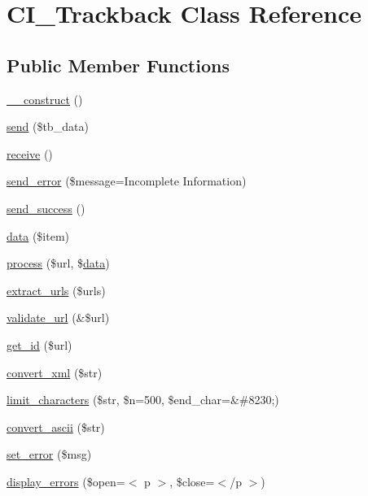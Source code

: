 \hypertarget{class_c_i___trackback}{}\section{C\+I\+\_\+\+Trackback Class Reference}
\label{class_c_i___trackback}
\subsection*{Public Member Functions}
\begin{DoxyCompactItemize}
\item 
\mbox{\hyperlink{class_c_i___trackback_a095c5d389db211932136b53f25f39685}{\+\_\+\+\_\+construct}} ()
\item 
\mbox{\hyperlink{class_c_i___trackback_a4ee54341ef16e67ca033704f4373a56b}{send}} (\$tb\+\_\+data)
\item 
\mbox{\hyperlink{class_c_i___trackback_ac805eb3a4eb25b19c1ab093023da4d35}{receive}} ()
\item 
\mbox{\hyperlink{class_c_i___trackback_a1d4188b1ba4d71ad5392bee635102e87}{send\+\_\+error}} (\$message=\textquotesingle{}Incomplete Information\textquotesingle{})
\item 
\mbox{\hyperlink{class_c_i___trackback_a57468453a4dc88340fdf12fb6e314248}{send\+\_\+success}} ()
\item 
\mbox{\hyperlink{class_c_i___trackback_a4d04a7a984a4bcc71e27be87706f393c}{data}} (\$item)
\item 
\mbox{\hyperlink{class_c_i___trackback_a7244ffd64e186d863812bb300fec8cdc}{process}} (\$url, \$\mbox{\hyperlink{class_c_i___trackback_a4d04a7a984a4bcc71e27be87706f393c}{data}})
\item 
\mbox{\hyperlink{class_c_i___trackback_aab29f333201544b83e318dd761ac797a}{extract\+\_\+urls}} (\$urls)
\item 
\mbox{\hyperlink{class_c_i___trackback_a5caa264fab6d2b2344e6bd5b298b08f2}{validate\+\_\+url}} (\&\$url)
\item 
\mbox{\hyperlink{class_c_i___trackback_a404e345e61e00d5685117a101b5bc71a}{get\+\_\+id}} (\$url)
\item 
\mbox{\hyperlink{class_c_i___trackback_a1ec67af2037561b65ffe49b59727cb53}{convert\+\_\+xml}} (\$str)
\item 
\mbox{\hyperlink{class_c_i___trackback_a55f0b98881441e99d74c657c3b005f11}{limit\+\_\+characters}} (\$str, \$n=500, \$end\+\_\+char=\textquotesingle{}\&\#8230;\textquotesingle{})
\item 
\mbox{\hyperlink{class_c_i___trackback_a0029bda7d34a222a5bda4ac894c31ac1}{convert\+\_\+ascii}} (\$str)
\item 
\mbox{\hyperlink{class_c_i___trackback_a892f1ba7cba3731a3fc68f1f64e92610}{set\+\_\+error}} (\$msg)
\item 
\mbox{\hyperlink{class_c_i___trackback_a71a6f2e6d97ff5347257f101002bc903}{display\+\_\+errors}} (\$open=\textquotesingle{}$<$ p $>$\textquotesingle{}, \$close=\textquotesingle{}$<$/p $>$\textquotesingle{})
\end{DoxyCompactItemize}
